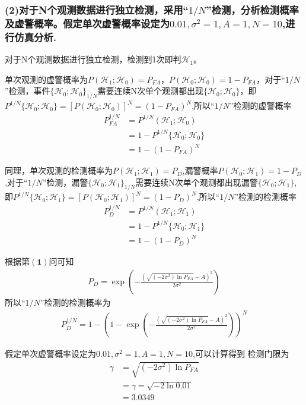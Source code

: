 \documentclass[fontset=windows]{article}
\numberwithin{figure}{section}
\begin{document}
\subsubsection*{(2)对于N个观测数据进行独立检测，采用“\(1/N\)”检测，分析检测概率及虚警概率。假定单次虚警概率设定为\(0.01,\sigma^2=1,A=1,N=10\),进行仿真分析.}

对于N个观测数据进行独立检测，检测到1次即判\(\mathcal{H}_1\)。

单次观测的虚警概率为\(P(\mathcal{H}_1;\mathcal{H}_0)=P_{FA}\)，\(P(\mathcal{H}_0;\mathcal{H}_0)=1-P_{FA}\)，对于“\(1/N\)”检测，事件\(\{\mathcal{H}_0;\mathcal{H}_0\}_{1/N}\)需要连续N次单个观测都出现\(\{\mathcal{H}_0;\mathcal{H}_0\}\)，即\(P^{1/N}\{\mathcal{H}_0;\mathcal{H}_0\}=[P(\mathcal{H}_0;\mathcal{H}_0)]^N=(1-P_{FA})^N\),所以“\(1/N\)”检测的虚警概率
\begin{align*}
	P^{1/N}_{FA} & =P^{1/N}(\mathcal{H}_1;\mathcal{H}_0)     \\
	             & =1-P^{1/N}\{\mathcal{H}_0;\mathcal{H}_0\} \\
	             & =1-(1-P_{FA})^N
\end{align*}

同理，单次观测的检测概率为\(P(\mathcal{H}_1;\mathcal{H}_1)=P_D\),漏警概率\(P(\mathcal{H}_0;\mathcal{H}_1)=1-P_D\),对于“\(1/N\)”检测，漏警\(\{\mathcal{H}_0;\mathcal{H}_1\}_{1/N}\)需要连续N次单个观测都出现漏警\(\{\mathcal{H}_0;\mathcal{H}_1\}\),即\(P^{1/N}\{\mathcal{H}_0;\mathcal{H}_1\}=[P(\mathcal{H}_0;\mathcal{H}_1)]^N=(1-P_D)^N\),所以“\(1/N\)”检测的检测概率
\begin{align*}
	P^{1/N}_D & =P^{1/N}(\mathcal{H}_1;\mathcal{H}_1)     \\
	          & =1-P^{1/N}\{\mathcal{H}_0;\mathcal{H}_1\} \\
	          & =1-(1-P_D)^N
\end{align*}

根据第\(\mathbf{(1)}\)问可知
\begin{align*}
	P_D =\exp\left(-\frac{(\sqrt{(-2\sigma^2)\ln P_{FA}}-A)^2}{2\sigma^2}\right)
\end{align*}
所以“\(1/N\)”检测的检测概率为
\begin{align*}
	P^{1/N}_D=1-\left(1-\exp\left(-\frac{(\sqrt{(-2\sigma^2)\ln P_{FA}}-A)^2}{2\sigma^2}\right)\right)^N
\end{align*}

假定单次虚警概率设定为\(0.01,\sigma^2=1,A=1,N=10\),可以计算得到
检测门限为
\begin{align*}
	\gamma & =\sqrt{(-2\sigma^2)\ln P_{FA}} \\
	       & =\gamma=\sqrt{-2\ln 0.01}      \\
	       & =3.0349
\end{align*}
\end{document}
